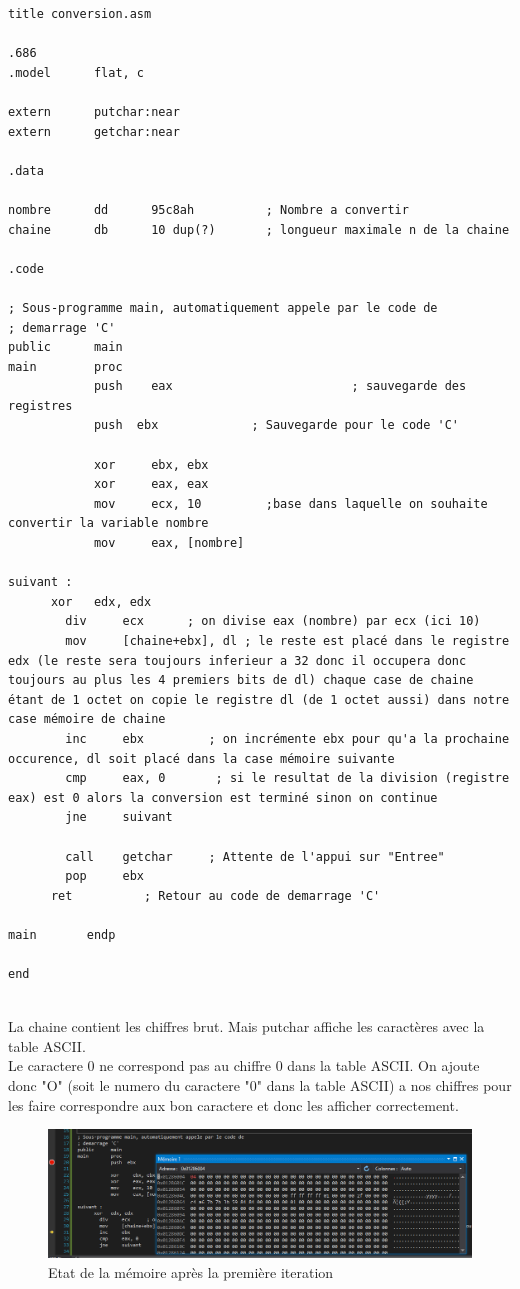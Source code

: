 \documentclass[11pt]{report}
\begin{document}
\begin{lstlisting}
title conversion.asm

.686
.model 		flat, c

extern      putchar:near
extern      getchar:near

.data

nombre      dd      95c8ah          ; Nombre a convertir
chaine      db      10 dup(?)       ; longueur maximale n de la chaine

.code

; Sous-programme main, automatiquement appele par le code de
; demarrage 'C'
public      main
main        proc
			push 	eax							; sauvegarde des registres
			push  ebx             ; Sauvegarde pour le code 'C'

			xor		ebx, ebx
			xor		eax, eax
			mov		ecx, 10         ;base dans laquelle on souhaite convertir la variable nombre
			mov		eax, [nombre]

suivant :
      xor 	edx, edx
	    div	    ecx      ; on divise eax (nombre) par ecx (ici 10)
	    mov     [chaine+ebx], dl ; le reste est placé dans le registre edx (le reste sera toujours inferieur a 32 donc il occupera donc toujours au plus les 4 premiers bits de dl) chaque case de chaine étant de 1 octet on copie le registre dl (de 1 octet aussi) dans notre case mémoire de chaine
	    inc     ebx         ; on incrémente ebx pour qu'a la prochaine occurence, dl soit placé dans la case mémoire suivante
	    cmp     eax, 0       ; si le resultat de la division (registre eax) est 0 alors la conversion est terminé sinon on continue
	    jne     suivant

	    call    getchar     ; Attente de l'appui sur "Entree"
	    pop     ebx
      ret          ; Retour au code de demarrage 'C'

main       endp

end


\end{lstlisting}

La chaine contient les chiffres brut. Mais putchar affiche les caractères avec la table ASCII.
\\Le caractere 0 ne correspond pas au chiffre 0 dans la table ASCII. On ajoute donc "O" (soit le numero du caractere "0" dans la table ASCII) a nos chiffres pour les faire correspondre aux bon caractere et donc les afficher correctement.

\begin{figure}[ht]
\includegraphics[width=12cm]{Capture9.PNG}
\caption{Etat de la mémoire après la première iteration}
\end{figure}
\end{document}
